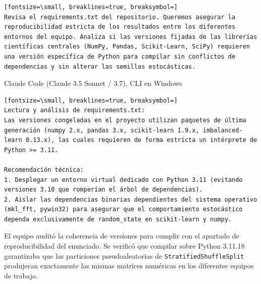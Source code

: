 \documentclass[12pt,a4paper,oneside]{book}
\begin{document}
\begin{iaprompt}
\begin{Verbatim}[fontsize=\small, breaklines=true, breaksymbol=]
Revisa el requirements.txt del repositorio. Queremos asegurar la reproducibilidad estricta de los resultados entre los diferentes entornos del equipo. Analiza si las versiones fijadas de las librerías científicas centrales (NumPy, Pandas, Scikit-Learn, SciPy) requieren una versión específica de Python para compilar sin conflictos de dependencias y sin alterar las semillas estocásticas.
\end{Verbatim}
\end{iaprompt}
\begin{iaresp}{Claude Code (Claude 3.5 Sonnet / 3.7), CLI en Windows}
\begin{Verbatim}[fontsize=\small, breaklines=true, breaksymbol=]
Lectura y análisis de requirements.txt:
Las versiones congeladas en el proyecto utilizan paquetes de última generación (numpy 2.x, pandas 3.x, scikit-learn 1.9.x, imbalanced-learn 0.13.x), las cuales requieren de forma estricta un intérprete de Python >= 3.11.

Recomendación técnica:
1. Desplegar un entorno virtual dedicado con Python 3.11 (evitando versiones 3.10 que romperían el árbol de dependencias).
2. Aislar las dependencias binarias dependientes del sistema operativo (mkl_fft, pywin32) para asegurar que el comportamiento estocástico dependa exclusivamente de random_state en scikit-learn y numpy.
\end{Verbatim}
\end{iaresp}
\begin{iaanalisis}
El equipo auditó la coherencia de versiones para cumplir con el apartado de reproducibilidad del enunciado. Se verificó que compilar sobre Python 3.11.18 garantizaba que las particiones pseudoaleatorias de \texttt{StratifiedShuffleSplit} produjeran exactamente las mismas matrices numéricas en los diferentes equipos de trabajo.
\end{iaanalisis}
\end{document}
